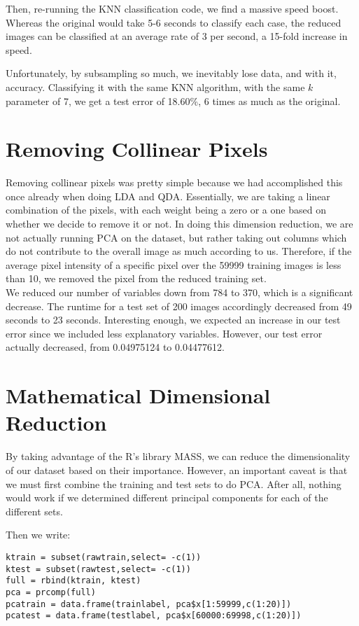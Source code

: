 \documentclass[10pt]{extarticle}
\begin{document}
Then, re-running the KNN classification code, we find a massive speed boost. Whereas the original would take 5-6 seconds to classify each case, the reduced images can be classified at an average rate of 3 per second, a 15-fold increase in speed. 

Unfortunately, by subsampling so much, we inevitably lose data, and with it, accuracy. Classifying it with the same KNN algorithm, with the same $k$ parameter of 7, we get a test error of 18.60\%, 6 times as much as the original. 




\section{Removing Collinear Pixels}
\blank

Removing collinear pixels was pretty simple because we had accomplished this once already when doing LDA and QDA. Essentially, we are taking a linear combination of the pixels, with each weight being a zero or a one based on whether we decide to remove it or not. In doing this dimension reduction, we are not actually running PCA on the dataset, but rather taking out columns which do not contribute to the overall image as much according to us. Therefore, if the average pixel intensity of a specific pixel over the 59999 training images is less than 10, we removed the pixel from the reduced training set.\\

We reduced our number of variables down from 784 to 370, which is a significant decrease. The runtime for a test set of 200 images accordingly decreased from 49 seconds to 23 seconds. Interesting enough, we expected an increase in our test error since we included less explanatory variables. However, our test error actually decreased, from 0.04975124 to 0.04477612.

\section{Mathematical Dimensional Reduction}
\blank
By taking advantage of the R's library MASS, we can reduce the dimensionality of our dataset based on their importance. However, an important caveat is that we must first combine the training and test sets to do PCA. After all, nothing would work if we determined different principal components for each of the different sets. 

Then we write:

\begin{verbatim}
ktrain = subset(rawtrain,select= -c(1))
ktest = subset(rawtest,select= -c(1))
full = rbind(ktrain, ktest)
pca = prcomp(full)
pcatrain = data.frame(trainlabel, pca$x[1:59999,c(1:20)])
pcatest = data.frame(testlabel, pca$x[60000:69998,c(1:20)])
\end{verbatim}
\end{document}
